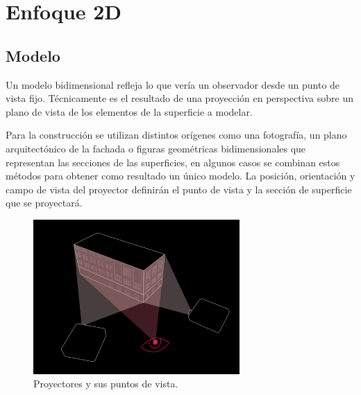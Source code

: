 \section{Enfoque 2D}
\subsection{Modelo}
Un modelo bidimensional refleja lo que vería un observador desde un punto de vista fijo.
Técnicamente es el resultado de una proyección en perspectiva \cite{LibroCompGrafica} sobre un plano de vista de los elementos de la superficie a modelar.

Para la construcción se utilizan distintos orígenes como una fotografía, un plano arquitectónico de la fachada o figuras geométricas bidimensionales que representan las secciones de las superficies, en algunos casos se combinan estos métodos para obtener como resultado un único modelo.
La posición, orientación y campo de vista del proyector definirán el punto de vista y la sección de superficie que se proyectará.
\begin{figure}[H]
  \centering
    \includegraphics[width=0.7\textwidth]{./Cap2_videomapping/diagrama-2proyectores}
  \caption{Proyectores y sus puntos de vista.}
  \label{fig:diagrama-2proyectores}
\end{figure}

